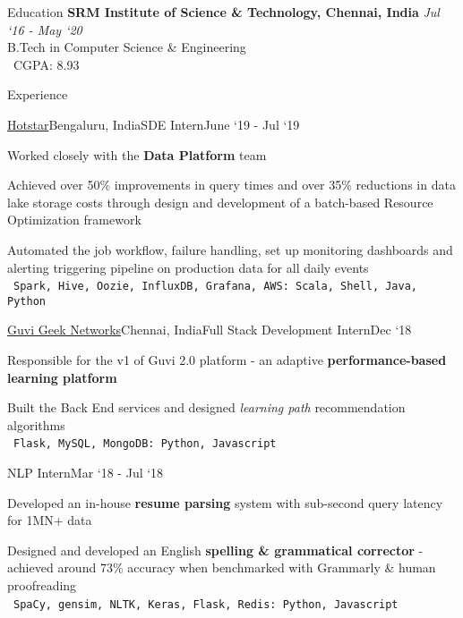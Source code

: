 \documentclass{resume}
\begin{document}
  \begin{rSection}{Education}
    {\bf SRM Institute of Science \& Technology, Chennai, India} \hfill {\em Jul `16 - May `20} \\ 
    { B.Tech in Computer Science \& Engineering } \\
    \textbullet\ CGPA: 8.93
    
  \end{rSection}
  
  \begin{rSection}{Experience}
  
    \begin{rSubsection}{\href{https://tech.hotstar.com/}{Hotstar}}{Bengaluru, India}{SDE Intern}{June `19 - Jul `19}
    \item[] Worked closely with the \textbf{Data Platform} team
    \item Achieved over 50\% improvements in query times and over 35\% reductions in data lake storage costs through design and development of a batch-based Resource Optimization framework
    \item Automated the job workflow, failure handling, set up monitoring dashboards and alerting triggering pipeline on production data for all daily events\\
    \textbullet\ \texttt{Spark, Hive, Oozie, InfluxDB, Grafana, AWS: Scala, Shell, Java, Python}
    \end{rSubsection}

    \begin{rSubsection}{\href{https://www.guvi.in/}{Guvi Geek Networks}}{Chennai, India}{Full Stack Development Intern}{Dec `18}
    \item[] Responsible for the v1 of Guvi 2.0 platform - an adaptive \textbf{performance-based learning platform}
    \item Built the Back End services and designed \textit{learning path} recommendation algorithms\\
    \textbullet\ \texttt{Flask, MySQL, MongoDB: Python, Javascript}
    \end{rSubsection}

    \vspace*{-\baselineskip}

    \begin{rSubsection}{}{}{NLP Intern}{Mar `18 - Jul `18}
    \item Developed an in-house \textbf{resume parsing} system with sub-second query latency for 1MN+ data
    \item Designed and developed an English \textbf{spelling \& grammatical corrector} - achieved around 73\% accuracy when benchmarked with Grammarly \& human proofreading\\
    \textbullet\ \texttt{SpaCy, gensim, NLTK, Keras, Flask, Redis: Python, Javascript}
    \end{rSubsection}
  
  \end{rSection}
  
\end{document}
